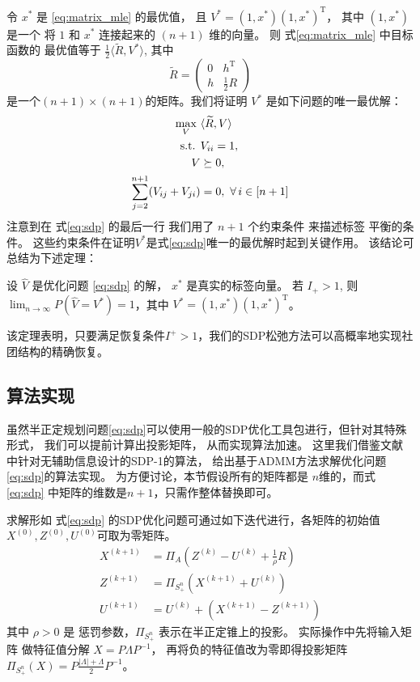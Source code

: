 令 $x^*$ 是 \eqref{eq:matrix_mle} 的最优值，
且 $V^*=(1,x^*)(1,x^*)^{\mathrm{T}}$， 
其中 $(1,x^*)$ 是一个
将 $1$ 和 $x^*$ 连接起来的
$(n+1)$ 维的向量。
	则 式\eqref{eq:matrix_mle} 中目标函数的
    最优值等于 $\frac{1}{2} \langle \widetilde{R}, V^* \rangle$, 其中
	\begin{equation}\label{eq:B_lambda_def}
		\widetilde{R} = \begin{pmatrix} 0 & h^{\mathrm{T}}  \\ h  & \frac{1}{2}R \end{pmatrix} 
	\end{equation}
	是一个$(n+1)\times(n+1)$的矩阵。我们将证明 $V^*$ 是如下问题的唯一最优解：
	\begin{align}
		\max_V\ & \langle \widetilde{R}, V \rangle  \notag\\
		\textrm{ s.t. }  &V_{ii} = 1, \notag\\
		V &\succeq 0, \notag\\
\sum_{j=2}^{n+1} (V_{ij} + V_{ji})& = 0,~\forall\, i\in [n+1]
\label{eq:sdp}
	\end{align}
	注意到在 式\eqref{eq:sdp} 的最后一行
    我们用了 $n+1$ 个约束条件 来描述标签 平衡的条件。
    这些约束条件在证明$V^*$是式\eqref{eq:sdp}唯一的最优解时起到关键作用。
    该结论可总结为下述定理：

	\begin{theorem}\label{thm:sdp}
        设 $\hat{V}$ 是优化问题 \eqref{eq:sdp} 的解，
        $x^*$ 是真实的标签向量。
		若 $I_+ > 1$, 则
        $\lim_{n\to\infty} P(\hat{V}=V^*)=1$，其中
		$V^*=(1,x^*)(1,x^*)^{\mathrm{T}}$。
	\end{theorem}
    该定理表明，只要满足恢复条件$I^+>1$，我们的SDP松弛方法可以高概率地实现社团结构的精确恢复。


\subsection{算法实现}\label{sec:sdp_admm}
虽然半正定规划问题\eqref{eq:sdp}可以使用一般的SDP优化工具包进行，但针对其特殊形式，
我们可以提前计算出投影矩阵，
从而实现算法加速。
这里我们借鉴文献  中针对无辅助信息设计的SDP-1的算法，
给出基于ADMM方法求解优化问题\eqref{eq:sdp}的算法实现。
为方便讨论，本节假设所有的矩阵都是 $n$维的，而式 \eqref{eq:sdp} 中矩阵的维数是$n+1$，只需作整体替换即可。

求解形如 式\eqref{eq:sdp} 的SDP优化问题可通过如下迭代进行，各矩阵的初始值$X^{(0)},Z^{(0)},U^{(0)}$可取为零矩阵。
\begin{align}
    X^{(k+1)} &= \Pi_A\left(Z^{(k)} - U^{(k)} + \frac{1}{\rho}R \right)\label{eq:admm} \\
    Z^{(k+1)} &= \Pi_{S_+^n}(X^{(k+1)} + U^{(k)}) \\
    U^{(k+1)} &= U^{(k)} + (X^{(k+1)} - Z^{(k+1)}) 
    \end{align}
其中 $\rho>0$ 是 惩罚参数，$\Pi_{S_+^n}$ 表示在半正定锥上的投影。
实际操作中先将输入矩阵 做特征值分解 $X=P\Lambda P^{-1}$，
再将负的特征值改为零即得投影矩阵$\Pi_{S_+^n}(X)=P\frac{|\Lambda| + \Lambda}{2}P^{-1}$。


